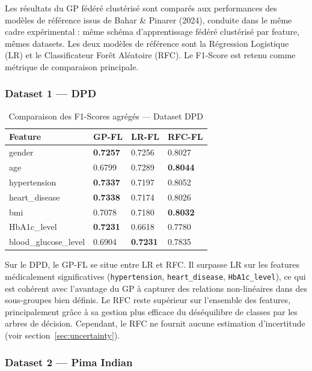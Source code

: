 \documentclass[12pt,a4paper]{article}
\begin{document}
Les résultats du GP fédéré clustérisé sont comparés aux performances des modèles de référence issus de Bahar \& Pinarer (2024), conduite dans le même cadre expérimental : même schéma d'apprentissage fédéré clustérisé par feature, mêmes datasets. Les deux modèles de référence sont la Régression Logistique (LR) et le Classificateur Forêt Aléatoire (RFC). Le F1-Score est retenu comme métrique de comparaison principale.

\subsubsection*{Dataset 1 — DPD}

\begin{table}[H]
\centering
\caption{Comparaison des F1-Scores agrégés — Dataset DPD}
\label{tab:comparison_dpd}
\small
\begin{tabular}{p{3.5cm}p{2.5cm}p{2.5cm}p{2.5cm}}
\hline
\textbf{Feature} & \textbf{GP-FL} & \textbf{LR-FL} & \textbf{RFC-FL} \\
\hline
gender               & \textbf{0.7257} & 0.7256 & 0.8027 \\
age                  & 0.6799          & 0.7289 & \textbf{0.8044} \\
hypertension         & \textbf{0.7337} & 0.7197 & 0.8052 \\
heart\_disease        & \textbf{0.7338} & 0.7174 & 0.8026 \\
bmi                  & 0.7078          & 0.7180 & \textbf{0.8032} \\
HbA1c\_level         & \textbf{0.7231} & 0.6618 & 0.7780 \\
blood\_glucose\_level & 0.6904         & \textbf{0.7231} & 0.7835 \\
\hline
\end{tabular}
\end{table}

Sur le DPD, le GP-FL se situe entre LR et RFC. Il surpasse LR sur les features médicalement significatives (\texttt{hypertension}, \texttt{heart\_disease}, \texttt{HbA1c\_level}), ce qui est cohérent avec l'avantage du GP à capturer des relations non-linéaires dans des sous-groupes bien définis. Le RFC reste supérieur sur l'ensemble des features, principalement grâce à sa gestion plus efficace du déséquilibre de classes par les arbres de décision. Cependant, le RFC ne fournit aucune estimation d'incertitude (voir section~\ref{sec:uncertainty}).

\subsubsection*{Dataset 2 — Pima Indian}
\end{document}

